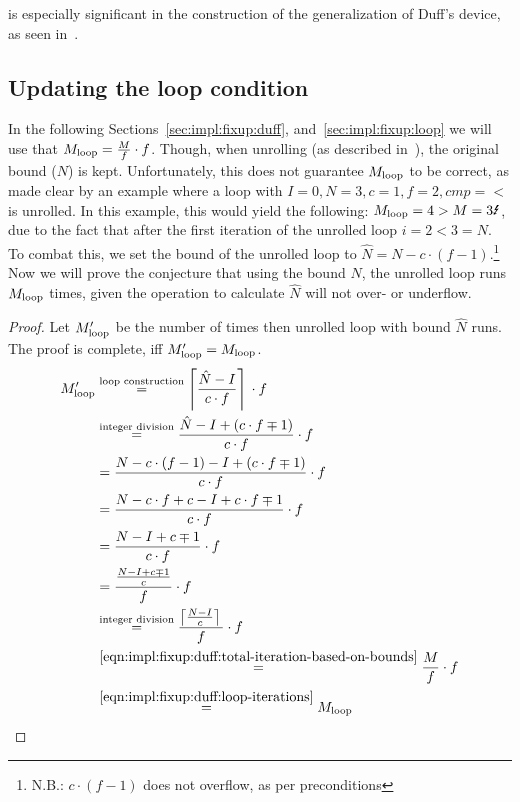  is especially significant in the construction of the generalization of Duff's device, as seen in~.

\subsection{Updating the loop condition}\label{sec:impl:fixup:header-cond}

In the following Sections~\ref{sec:impl:fixup:duff}, and~\ref{sec:impl:fixup:loop} we will use that $M_{\text{loop}} = \frac{M}{f} \cdot f$.
Though, when unrolling (as described in~), the original bound ($N$) is kept.
Unfortunately, this does not guarantee $M_{\text{loop}}$ to be correct, as made clear by an example where a loop with $I = 0, N = 3, c = 1, f = 2, cmp = <$ is unrolled.
In this example, this would yield the following: $\Mloop = 4 > M = 3 \mLightning$, due to the fact that after the first iteration of the unrolled loop $i = 2 < 3 = N$.
To combat this, we set the bound of the unrolled loop to $\hat{N} = N - c \cdot (f - 1)$.\footnote{N.B.: $c \cdot (f - 1)$ does not overflow, as per preconditions}
Now we will prove the conjecture that using the bound $\hat{N}$, the unrolled loop runs $M_{\text{loop}}$ times, given the operation to calculate $\hat{N}$ will not over- or underflow.
\begin{proof}
    Let $M_{\text{loop}}'$ be the number of times then unrolled loop with bound $\hat{N}$ runs.
    The proof is complete, iff $M_{\text{loop}}' = M_{\text{loop}}$.
    \begin{align*}
        M_{\text{loop}}' &\overset{\text{loop construction}}{=} \left\lceil{}\frac{\hat{N} - I}{c \cdot f}\right\rceil{} \cdot f\\
        &\overset{\text{integer division}}{=} \frac{\hat{N} - I + (c \cdot f \mp 1)}{c \cdot f} \cdot f\\
        &= \frac{N - c \cdot (f - 1) - I + (c \cdot f \mp 1)}{c \cdot f} \cdot f\\
        &= \frac{N - c \cdot f + c - I + c \cdot f \mp 1}{c \cdot f} \cdot f\\
        &= \frac{N - I + c \mp 1}{c \cdot f} \cdot f\\
        &= \frac{\frac{N - I + c \mp 1}{c}}{f} \cdot f\\
        &\overset{\text{integer division}}{=} \frac{\left\lceil{}\frac{N - I}{c}\right\rceil{}}{f} \cdot f\\
        &\overset{\ref{eqn:impl:fixup:duff:total-iteration-based-on-bounds}}{=} \frac{M}{f} \cdot f\\
        &\overset{\ref{eqn:impl:fixup:duff:loop-iterations}}{=} M_{\text{loop}}
    \end{align*}
\end{proof}

